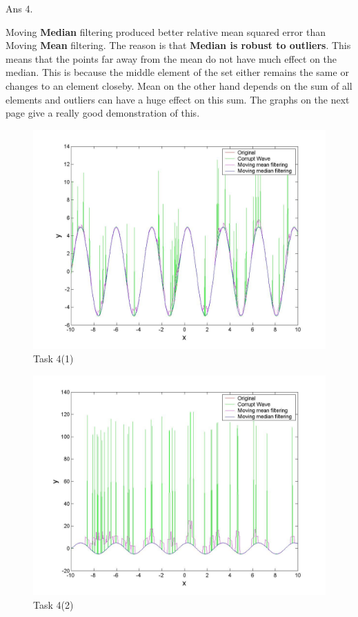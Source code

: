 \documentclass[11pt]{article}
\begin{document}
\vspace{50px}
Ans 4.\begin{center}
Moving \textbf{Median} filtering produced better relative mean squared error than Moving \textbf{Mean} filtering. The reason is that \textbf{Median is robust to outliers}. This means that the points far away from the mean do not have much effect on the median. This is because the middle element of the set either remains the same or changes to an element closeby. Mean on the other hand depends on the sum of all elements and outliers can have a huge effect on this sum. The graphs on the next page give a really good demonstration of this.
\end{center}

\begin{figure}
  \includegraphics[width=\linewidth]{2.jpg}
  \caption{Task 4(1)}
  \label{fig:task4_1}
\end{figure}

\begin{figure}
  \includegraphics[width=\linewidth]{1.jpg}
  \caption{Task 4(2)}
  \label{fig:task4_2}
\end{figure}
\pagebreak
\end{document}
